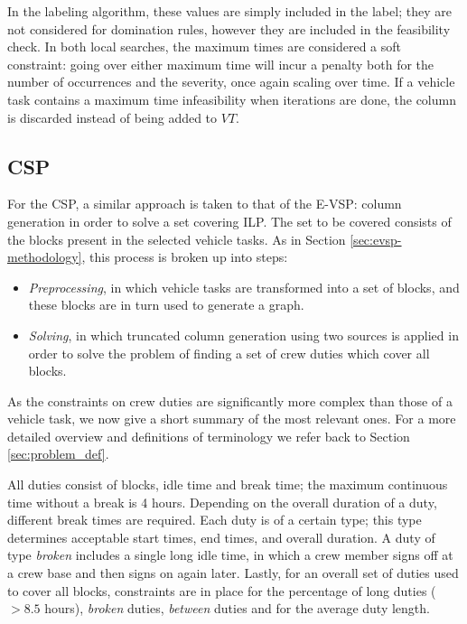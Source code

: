 \documentclass[]{article}
\begin{document}
In the labeling algorithm, these values are simply included in the label; they are not considered for domination rules, however they are included in the feasibility check. In both local searches, the maximum times are considered a soft constraint: going over either maximum time will incur a penalty both for the number of occurrences and the severity, once again scaling over time. If a vehicle task contains a maximum time infeasibility when iterations are done, the column is discarded instead of being added to $VT$.

\subsection{CSP} \label{sec:csp-methodology}
For the CSP, a similar approach is taken to that of the E-VSP: column generation in order to solve a set covering ILP. The set to be covered consists of the blocks present in the selected vehicle tasks. As in Section \ref{sec:evsp-methodology}, this process is broken up into steps: 
\begin{itemize}
  \item \textit{Preprocessing}, in which vehicle tasks are transformed into a set of blocks, and these blocks are in turn used to generate a graph. 
  \item \textit{Solving}, in which truncated column generation using two sources is applied in order to solve the problem of finding a set of crew duties which cover all blocks. 
\end{itemize} 
As the constraints on crew duties are significantly more complex than those of a vehicle task, we now give a short summary of the most relevant ones. For a more detailed overview and definitions of terminology we refer back to Section \ref{sec:problem_def}.

All duties consist of blocks, idle time and break time; the maximum continuous time without a break is 4 hours. Depending on the overall duration of a duty, different break times are required. Each duty is of a certain type; this type determines acceptable start times, end times, and overall duration. A duty of type \textit{broken} includes a single long idle time, in which a crew member signs off at a crew base and then signs on again later. Lastly, for an overall set of duties used to cover all blocks, constraints are in place for the percentage of long duties ($>8.5$ hours), \textit{broken} duties, \textit{between} duties and for the average duty length.
\end{document}
